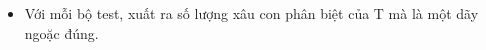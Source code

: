 \begin{itemize}
	\item     Với mỗi bộ test, xuất ra số lượng xâu con phân biệt của T mà là một dãy ngoặc đúng.   
\end{itemize}

\